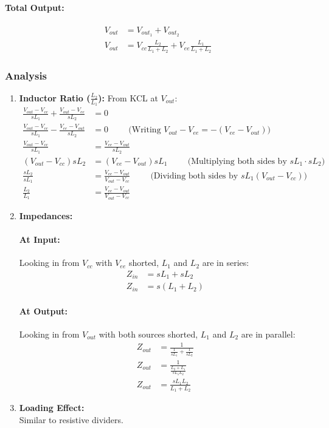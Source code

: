 \paragraph{Total Output:}
\begin{align*}
  V_{out} &= V_{out_1} + V_{out_2} \\
  V_{out} &= V_{cc} \frac{L_2}{L_1 + L_2} + V_{ee} \frac{L_1}{L_1 + L_2}
\end{align*}

\subsubsection{Analysis}
\begin{enumerate}
  \item \textbf{Inductor Ratio (\(\frac{L_2}{L_1}\)):}
    From KCL at \(V_{out}\):
    \begin{align*}
      \frac{V_{out} - V_{cc}}{sL_1} + \frac{V_{out} - V_{ee}}{sL_2} &= 0 \\
      \frac{V_{out} - V_{cc}}{sL_1} - \frac{V_{ee} - V_{out}}{sL_2} &= 0 \hspace{1cm} \text{(Writing \(V_{out} - V_{ee} = -(V_{ee} - V_{out})\))} \\
      \frac{V_{out} - V_{cc}}{sL_1} &= \frac{V_{ee} - V_{out}}{sL_2} \\
      (V_{out} - V_{cc}) sL_2 &= (V_{ee} - V_{out}) sL_1 \hspace{1cm} \text{(Multiplying both sides by \(sL_1 \cdot sL_2\))} \\
      \frac{sL_2}{sL_1} &= \frac{V_{ee} - V_{out}}{V_{out} - V_{cc}} \hspace{1cm} \text{(Dividing both sides by \(sL_1(V_{out} - V_{cc})\))} \\
      \frac{L_2}{L_1} &= \frac{V_{ee} - V_{out}}{V_{out} - V_{cc}}
    \end{align*}
  \item \textbf{Impedances:}
    \paragraph{At Input:} Looking in from \(V_{cc}\) with \(V_{ee}\) shorted,
    \(L_1\) and \(L_2\) are in series:
      \begin{align*}
        Z_{in} &= sL_1 + sL_2 \\
        Z_{in} &= s(L_1 + L_2)
      \end{align*}
    \paragraph{At Output:} Looking in from \(V_{out}\) with both sources
    shorted, \(L_1\) and \(L_2\) are in parallel:
      \begin{align*}
        Z_{out} &= \frac{1}{\frac{1}{sL_1} + \frac{1}{sL_2}} \\
        Z_{out} &= \frac{1}{\frac{L_2 + L_1}{sL_1 L_2}} \\
        Z_{out} &= \frac{sL_1 L_2}{L_1 + L_2}
      \end{align*}
  \item \textbf{Loading Effect:} \\
    Similar to resistive dividers.
\end{enumerate}

